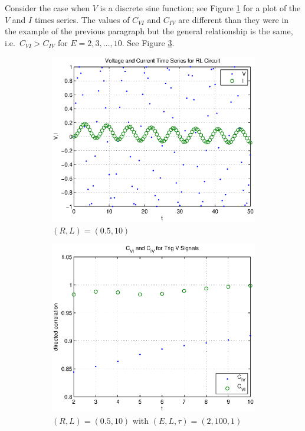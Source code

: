 \documentclass[a4paper,11pt]{article}
\begin{document}
Consider the case when $V$ is a discrete sine function; see Figure \ref{fig:RL_sinsignals} for a plot of the $V$ and $I$ times series.  The values of $C_{VI}$ and $C_{IV}$ are different than they were in the example of the previous paragraph but the general relationship is the same, i.e.\ $C_{VI}>C_{IV}$ for $E=2,3,\ldots,10$.  See Figure \ref{fig:RL_sinsignalsCCM}.
\begin{figure}[h!t]
\centering
\begin{subfigure}[b]{0.4\textwidth}
\label{fig:RL_sinsignals}
\includegraphics[scale=0.55]{graphics/RL_sinsignals.eps}
\caption{$(R,L) = (0.5,10)$}
\end{subfigure}
\begin{subfigure}[b]{0.4\textwidth}
\label{fig:RL_sinsignalsCCM}
\includegraphics[scale=0.55]{graphics/RL_sinsignalsCCM.eps}
\caption{$(R,L) = (0.5,10)$ with $\left(E,L,\tau\right)=\left(2,100,1\right)$}
\end{subfigure}
\caption{}
\end{figure}
\end{document}
